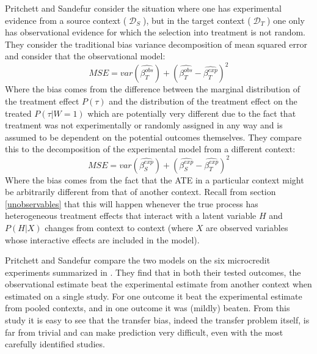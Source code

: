 \documentclass[a4paper,12pt]{article}
\DeclareMathOperator*{\D}{\mathcal{D}}
\begin{document}
Pritchett and Sandefur \parencite*{Pritchett2016} consider the situation where one has experimental evidence from a source context ($\D_S$), but in the target context ($\D_T$) one only has observational evidence for which the selection into treatment is not random. They consider the traditional bias variance decomposition of mean squared error and consider that the observational model:
%
$$
MSE = var(\hat{\beta^{obs}_T}) + (\hat{\beta^{obs}_T} - \hat{\beta^{exp}_T})^2
$$
%
Where the bias comes from the difference between the marginal distribution of the treatment effect $P(\tau)$ and the distribution of the treatment effect on the treated $P(\tau | W = 1)$ which are potentially very different due to the fact that treatment was not experimentally or randomly assigned in any way and is assumed to be dependent on the potential outcomes themselves. They compare this to the decomposition of the experimental model from a different context:
%
$$
MSE = var(\hat{\beta^{exp}_S}) + (\hat{\beta^{exp}_S} - \hat{\beta^{exp}_T})^2
$$
%
Where the bias comes from the fact that the ATE in a particular context might be arbitrarily different from that of another context. Recall from section \ref{unobservables} that this will happen whenever the true process has heterogeneous treatment effects that interact with a latent variable $H$ and $P(H | X)$ changes from context to context (where $X$ are observed variables whose interactive effects are included in the model).

Pritchett and Sandefur compare the two models on the six microcredit experiments summarized in \cite{Banerjee2015a}. They find that in both their tested outcomes, the observational estimate beat the experimental estimate from another context when estimated on a single study. For one outcome it beat the experimental estimate from pooled contexts, and in one outcome it was (mildly) beaten. From this study it is easy to see that the transfer bias, indeed the transfer problem itself, is far from trivial and can make prediction very difficult, even with the most carefully identified studies.
\end{document}
